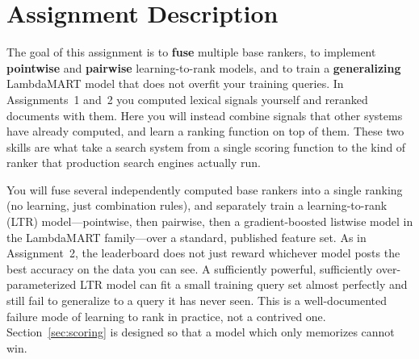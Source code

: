 \documentclass[10pt]{article}
\begin{document}
\section{Assignment Description}

The goal of this assignment is to \textbf{fuse} multiple base rankers, to implement \textbf{pointwise} and \textbf{pairwise} learning-to-rank models, and to train a \textbf{generalizing} LambdaMART model that does not overfit your training queries. In Assignments~1 and~2 you computed lexical signals yourself and reranked documents with them. Here you will instead combine signals that other systems have already computed, and learn a ranking function on top of them. These two skills are what take a search system from a single scoring function to the kind of ranker that production search engines actually run.

You will fuse several independently computed base rankers into a single ranking (no learning, just combination rules), and separately train a learning-to-rank (LTR) model---pointwise, then pairwise, then a gradient-boosted listwise model in the LambdaMART family---over a standard, published feature set. As in Assignment~2, the leaderboard does not just reward whichever model posts the best accuracy on the data you can see. A sufficiently powerful, sufficiently over-parameterized LTR model can fit a small training query set almost perfectly and still fail to generalize to a query it has never seen. This is a well-documented failure mode of learning to rank in practice, not a contrived one. Section~\ref{sec:scoring} is designed so that a model which only memorizes cannot win.

\end{document}
